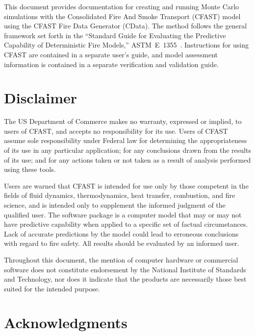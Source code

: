 \documentclass[12pt,twoside]{book}
\begin{document}
This document provides documentation for creating and running Monte Carlo simulations with the Consolidated Fire And Smoke Transport (CFAST) model using the CFAST Fire Data Generator (CData). The method follows the general framework set forth in the ``Standard Guide for Evaluating the Predictive Capability of Deterministic Fire Models,'' ASTM~E~1355~\cite{CFAST:ASTM:E1355}. Instructions for using CFAST are contained in a separate user's guide, and model assessment information is contained in a separate verification and validation guide.

%
%

\chapter{Disclaimer}

The US Department of Commerce makes no warranty, expressed or implied, to users of CFAST, and accepts no responsibility for its use. Users of CFAST assume sole responsibility under Federal law for determining the appropriateness of its use in any particular application; for any conclusions drawn from the results of its use; and for any actions taken or not taken as a result of analysis performed using these tools.

Users are warned that CFAST is intended for use only by those competent in the fields of fluid dynamics, thermodynamics, heat transfer, combustion, and fire science, and is intended only to supplement the informed judgment of the qualified user. The software package is a computer model that may or may not have predictive capability when applied to a specific set of factual circumstances. Lack of accurate predictions by the model could lead to erroneous conclusions with regard to fire safety. All results should be evaluated by an informed user.

Throughout this document, the mention of computer hardware or commercial software does not constitute endorsement by the National Institute of Standards and Technology, nor does it indicate that the products are necessarily those best suited for the intended purpose.


%
%

\chapter{Acknowledgments}
\end{document}
